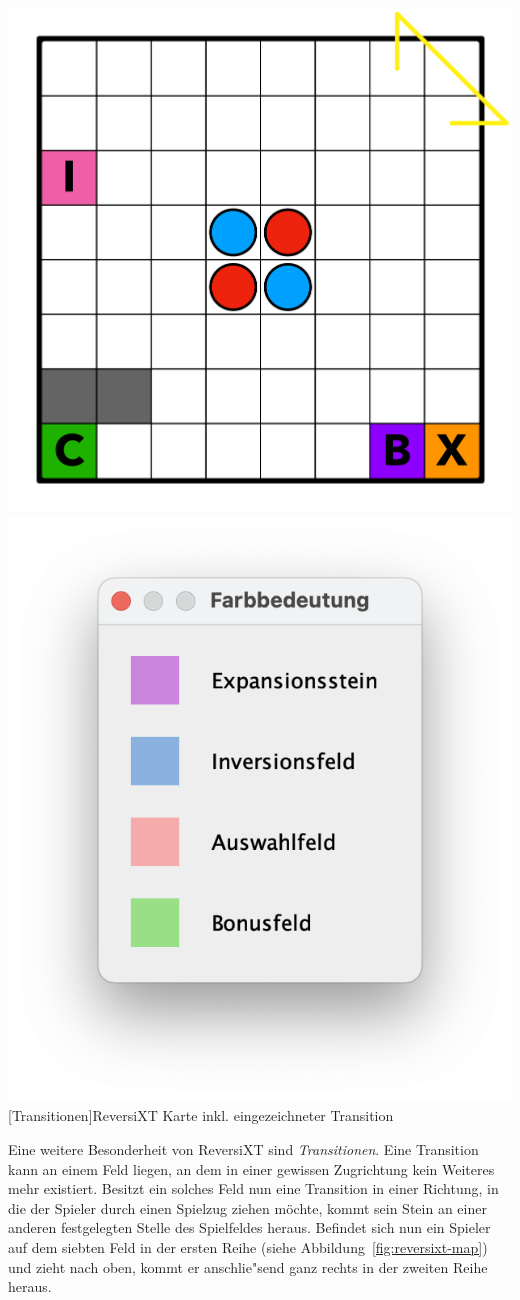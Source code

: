 \vspace{1em}
\begin{minipage}{\linewidth}
	\centering
	\includegraphics[width=0.5\linewidth]{pics/transition}
	\includegraphics[width=0.5\linewidth]{pics/color-meaning}
	[Transitionen]{ReversiXT Karte inkl. eingezeichneter Transition}
	\label{fig:reversixt-map}
\end{minipage}
\vspace{1em}

Eine weitere Besonderheit von ReversiXT sind \emph{Transitionen}.
Eine Transition kann an einem Feld liegen, an dem in einer gewissen Zugrichtung kein Weiteres mehr existiert.
Besitzt ein solches Feld nun eine Transition in einer Richtung, in die der Spieler durch einen Spielzug ziehen m\"ochte, kommt sein Stein an einer anderen festgelegten Stelle des Spielfeldes heraus.
Befindet sich nun ein Spieler auf dem siebten Feld in der ersten Reihe (siehe Abbildung~\ref{fig:reversixt-map}) und zieht nach oben, kommt er anschlie"send ganz rechts in der zweiten Reihe heraus.

